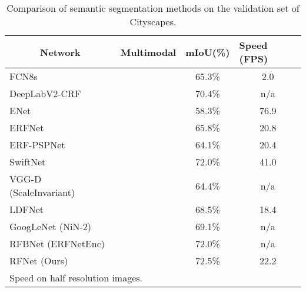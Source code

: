 \documentclass[letterpaper, 10 pt, journal, twoside]{ieeetran}
\newcommand{\cmark}{\ding{51}}\newcommand{\xmark}{\ding{55}}
\begin{document}
\begin{table}[htbp]
    \centering
    \caption{Comparison of semantic segmentation methods on the validation set of Cityscapes.}
    \label{comparison}
    \begin{tabular}{l|c|c|c}
    \multicolumn{1}{c|}{\textbf{Network}} & \textbf{Multimodal}       & \textbf{mIoU(\%)} & \multicolumn{1}{l}{\textbf{Speed (FPS)}} \\ \hline \hline
    FCN8s~\cite{long2015fully}   &  \xmark  &  65.3\%  &  2.0   \\
    DeepLabV2-CRF~\cite{chen2017deeplab}  & \xmark  &  70.4\%  &  n/a  \\ 
    ENet~\cite{paszke2016enet}   &  \xmark  &  58.3\%  &  76.9   \\
    ERFNet~\cite{romera2017erfnet}    &       \xmark     & 65.8\%            & 20.8                    \\
    ERF-PSPNet~\cite{ERF-PSPNet}     &     \xmark    & 64.1\%            & 20.4                    \\
    SwiftNet~\cite{orsic2019defense}      &    \xmark    & 72.0\%           & 41.0                            \\
    VGG-D (ScaleInvariant)~\cite{krevso2016convolutional}  & \cmark & 64.4\% & n/a \\
    LDFNet~\cite{hung2019incorporating}    & \cmark                & 68.5\%           & 18.4                                    \\
    GoogLeNet (NiN-2)~\cite{schneider2017multimodal} & \cmark  &  69.1\%  &  n/a  \\ RFBNet (ERFNetEnc)~\cite{deng2019rfbnet}     & \cmark                & 72.0\%            & n/a                                     \\ \hline
    RFNet (Ours)                           & \cmark                & 72.5\%            & 22.2                   \\
    \multicolumn{4}{l}{ Speed on half resolution images.}
    \end{tabular}
\end{table}
\end{document}
